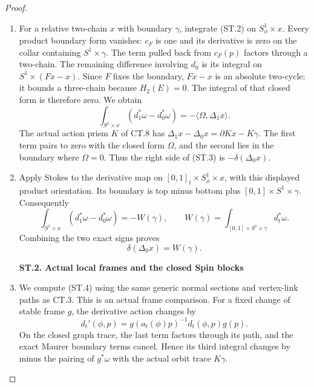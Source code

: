 \begin{proof}
\begin{enumerate}[label=\arabic*.]
\item For a relative two-chain \(x\) with boundary \(\gamma\), integrate
(ST.2) on \(S^1_\phi\times x\). Every product boundary form vanishes:
\(c_F\) is one and its derivative is zero on the collar containing
\(S^1\times\gamma\). The term pulled back from \(c_F(p)\) factors
through a two-chain. The remaining difference involving \(d_0\)
is its integral on \(S^1\times(Fx-x)\). Since \(F\) fixes the
boundary, \(Fx-x\) is an absolute two-cycle; it bounds a three-chain
because \(H_2(E)=0\). The integral of that closed form is therefore
zero. We obtain
\[
 \int_{S^1\times x}(d_1^*\omega-d_0^*\omega)
                   =-\langle\Omega,\Delta_1x\rangle. \tag{ST.3}
\]
The actual action prism \(K\) of CT.8 has
\(\Delta_1x-\Delta_0x=\partial Kx-K\gamma\).
The first term pairs to zero with the closed form \(\Omega\), and
the second lies in the boundary where \(\Omega=0\). Thus the
right side of (ST.3) is \(-\delta(\Delta_0x)\).

\item Apply Stokes to the derivative map on
\([0,1]_t\times S^1_\phi\times x\), with this displayed product
orientation. Its boundary is top minus bottom plus
\([0,1]\times S^1\times\gamma\). Consequently
\[
 \int_{S^1\times x}(d_1^*\omega-d_0^*\omega)
   =-W(\gamma),\qquad
 W(\gamma)=\int_{[0,1]\times S^1\times\gamma}d_t^*\omega.
                                                               \tag{ST.4}
\]
Combining the two exact signs proves
\[
                       \delta(\Delta_0x)=W(\gamma).    \tag{ST.5}
\]

\par

\medskip\noindent\textbf{ST.2. Actual local frames and the closed Spin blocks}

\par\nobreak

\item We compute (ST.4) using the same generic normal sections and
vertex-link paths as CT.3. This is an actual frame comparison.
For a fixed change of stable frame \(g\), the derivative action
changes by
\[
 d_t'(\phi,p)=g(a_t(\phi)p)^{-1}d_t(\phi,p)g(p).
                                                               \tag{ST.6}
\]
On the closed graph trace, the last term factors through its path,
and the exact Maurer boundary terms cancel. Hence its third
integral changes by minus the pairing of \(g^*\omega\) with the
actual orbit trace \(K\gamma\).


\end{enumerate}
\end{proof}

